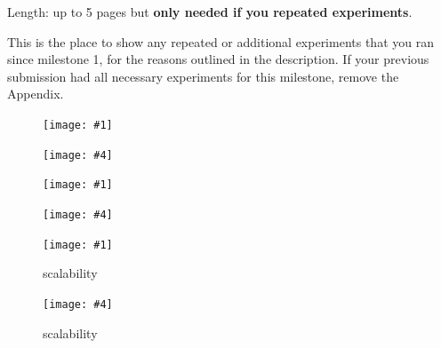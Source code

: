 \documentclass[11pt]{article}
\newcommand\TwoFig[6]{%
	\sbox\IBoxA{\texttt{[image: \#1]}}
	\sbox\IBoxB{\texttt{[image: \#4]}}%
	\ifdim\ht\IBoxA>\ht\IBoxB
	\setlength\IHeight{\ht\IBoxB}\else\setlength\IHeight{\ht\IBoxA}\fi%
	\begin{figure}[!htb]
		\minipage[t]{0.5\textwidth}\centering
		\texttt{[image: \#1]}
		\caption{#2}\label{#3}
		\endminipage \hfill
		\minipage[t]{0.5\textwidth}\centering
		\texttt{[image: \#4]}
		\caption{#5}\label{#6}
		\endminipage
	\end{figure}%
}
\begin{document}
Length: up to 5 pages but \textbf{only needed if you repeated experiments}.

This is the place to show any repeated or additional experiments that you ran since milestone 1, for the reasons outlined in the description. If your previous submission had all necessary experiments for this milestone, remove the Appendix.

\TwoFig {figures/max_tp_2/tp} {} {}
		{figures/max_tp_2/rt} {} {}
	
\TwoFig {figures/db_1M_2/tp} {} {}
		{figures/db_1M_2/rt} {} {}

\TwoFig {figures/scalability/tp} {scalability} {fig:stability_tp}
		{figures/scalability/rt} {scalability} {fig:stability_rt}
\end{document}
